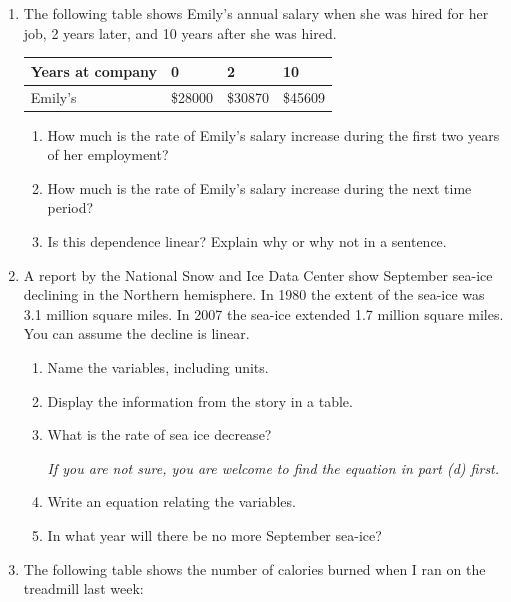 \documentclass[12pt]{article}
\begin{document}
\begin{enumerate}
\item The following table shows Emily's annual salary when she was hired for her job, 2 years later, and 10 years after she was hired.

\begin{center}
\begin{tabular} {|l||l|l|l|} \hline
Years at company & 0 & 2 & 10  \\ \hline
Emily's & \$28000 & \$30870 & \$45609 \\ \hline
\end{tabular}
\end{center}

\begin{enumerate}
\item How much is the rate of Emily's salary increase during the first two years of her employment?
\vfill
\item How much is the rate of Emily's salary increase during the next time period?
\vfill
\item Is this dependence linear? Explain why or why not in a sentence.
\vfill
\end{enumerate}

\newpage %

\item A report by the National Snow and Ice Data Center show September sea-ice declining in the Northern hemisphere. In 1980 the extent of the sea-ice was 3.1 million square miles.  In 2007 the sea-ice extended 1.7 million square miles.  You can assume the decline is linear.

\begin{enumerate}
\item Name the variables, including units.
\vfill
\item Display the information from the story in a table.
\vfill
\item What is the rate of sea ice decrease?

\emph{If you are not sure, you are welcome to find the equation in part (d) first.}
\vfill
\item Write an equation relating the variables.
\vfill
\item In what year will there be no more September sea-ice?
\vfill
\end{enumerate}

\newpage

\item The following table shows the number of calories burned when I ran on the treadmill last week:


\end{enumerate}
\end{document}
